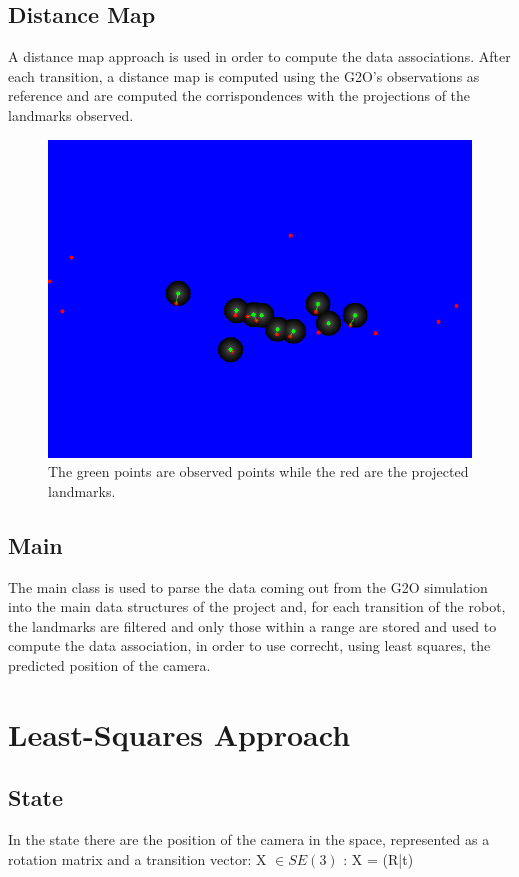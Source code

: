 \documentclass[10pt]{article}
\begin{document}
		\subsection{Distance Map}
		A distance map approach is used in order to compute the data associations.
		After each transition, a distance map is computed using the G2O's observations as reference and are computed the corrispondences with the projections of the landmarks observed.

		\begin{figure}[H]
			\centering
			\includegraphics[width=0.7\linewidth]{img/corrispondences}
			\caption{The green points are observed points while the red are the projected landmarks.}
			\label{fig:corrispondences}
		\end{figure}

		\subsection{Main}
		The main class is used to parse the data coming out from the G2O simulation into the main data structures of the project and, for each transition of the robot, the landmarks are filtered and only those within a range are stored and used to compute the data association, in order to use correcht, using least squares, the predicted position of the camera.\\
		 		
	\section{Least-Squares Approach}
	\subsection{State}
	In the state there are the position of the camera in the space, represented as a rotation matrix and a transition vector:
	X $\in \textit{SE}(3)$ : X = (R|t)
	
\end{document}
